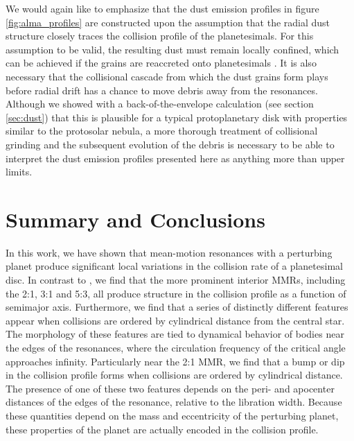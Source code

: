 We would again like to emphasize that the dust emission profiles in figure \ref{fig:alma_profiles} are constructed upon the 
assumption that the radial dust structure closely traces the collision profile of the planetesimals. For this assumption to be valid, 
the resulting dust must remain locally confined, which can be achieved if the grains are reaccreted onto planetesimals 
\cite{johansen15}. It is also necessary that the collisional cascade from which the dust grains form plays before radial drift has a 
chance to move debris away from the resonances. Although we showed with a back-of-the-envelope calculation (see section 
\ref{sec:dust}) that this is plausible for a typical protoplanetary disk with properties similar to the protosolar nebula, a more 
thorough treatment of collisional grinding and the subsequent evolution of the debris is necessary to be able to interpret the dust 
emission profiles presented here as anything more than upper limits.

\section{Summary and Conclusions}\label{sec:conclusions}

In this work, we have shown that mean-motion resonances with a perturbing planet produce significant local variations in the 
collision rate of a planetesimal disc. In contrast to \cite{richardson00}, we find that the more prominent interior MMRs, including 
the 2:1, 3:1 and 5:3, all produce structure in the collision profile as a function of semimajor axis. Furthermore, we find that a 
series of distinctly different features appear when collisions are ordered by cylindrical distance from the central star. The 
morphology of these features are tied to dynamical behavior of bodies near the edges of the resonances, where the circulation 
frequency of the critical angle approaches infinity. Particularly near the 2:1 MMR, we find that a bump or dip in the collision 
profile forms when collisions are ordered by cylindrical distance. The presence of one of these two features depends on the peri- 
and apocenter distances of the edges of the resonance, relative to the libration width. Because these quantities depend on the 
mass and eccentricity of the perturbing planet, these properties of the planet are actually encoded in the collision profile.

